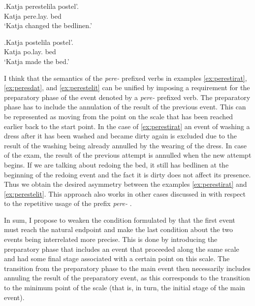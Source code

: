 \exg.\label{ex:perestelit}Katja perestelila postel'.\\
Katja pere.lay. bed\\
\trans `Katja changed the bedlinen.'

\exg.\label{ex:postelit}Katja postelila postel'.\\
Katja po.lay. bed\\
\trans `Katja made the bed.'

I think that the semantics of the \textit{pere-}  prefixed verbs in examples \ref{ex:perestirat}, \ref{ex:peresdat}, and \ref{ex:perestelit} can be unified by imposing a requirement for the preparatory phase of the event denoted by a \textit{pere-}  prefixed verb. The preparatory phase has to include the annulation of the result of the previous event. This can be represented as moving from the point on the scale that has been reached earlier back to the start point. In the case of \ref{ex:perestirat} an event of washing a dress after it has been washed and became dirty again is excluded due to the result of the washing being already annulled by the wearing of the dress. In case of the exam, the result of the previous attempt is annulled when the new attempt begins. If we are talking about redoing the bed, it still has bedlinen at the beginning of the redoing event and the fact it is dirty does not affect its presence. Thus we obtain the desired asymmetry between the examples \ref{ex:perestirat} and \ref{ex:perestelit}. This approach also works in other cases discussed in \citealt{Kagan:book} with respect to the repetitive  usage of the prefix \textit{pere-}  .

In sum, I propose to weaken the condition formulated by \citet{Kagan:book} that the first event must reach the natural endpoint and make the last condition about the two events being interrelated more precise. This is done by introducing the preparatory phase that includes an event that proceeded along the same scale and had some final stage associated with a certain point on this scale. The transition from the preparatory phase to the main event then necessarily includes annuling the result of the preparatory event, as this corresponds to the transition to the minimum point of the scale (that is, in turn, the initial stage of the main event).

